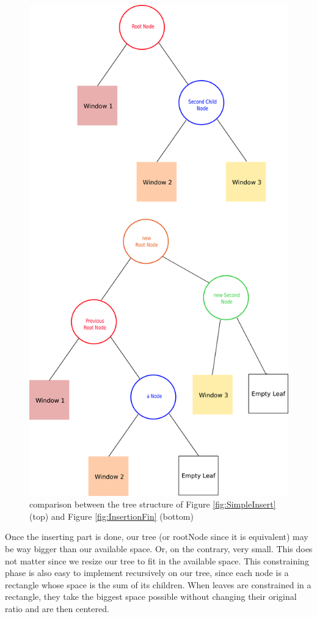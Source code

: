 \documentclass{acmtog}
\begin{document}
\begin{figure}
  \includegraphics[width=\linewidth]{Images/Treestructure.png}
  \caption{comparison between the tree structure of Figure \ref{fig:SimpleInsert} (top) and Figure \ref{fig:InsertionFin} (bottom)}
  \label{fig:TreeStructure}
\end{figure}

Once the inserting part is done, our tree (or rootNode since it is equivalent) may be way bigger than our available space. Or, on the contrary, very small. This does not matter since we resize our tree to fit in the available space. This constraining phase is also easy to implement recursively on our tree, since each node is a rectangle whose space is the sum of its children. When leaves are constrained in a rectangle, they take the biggest space possible without changing their original ratio and are then centered. 
\end{document}
